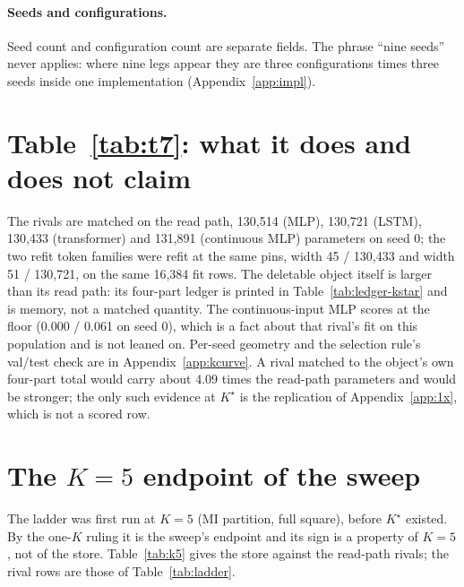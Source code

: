 \documentclass{article} %
\newcommand{\Kstar}{\ensuremath{K^{\star}}}
\begin{document}
\paragraph{Seeds and configurations.} Seed count and configuration count are separate fields. The
phrase ``nine seeds'' never applies: where nine legs appear they are three configurations times
three seeds inside one implementation (Appendix~\ref{app:impl}).

\section{Table~\ref{tab:t7}: what it does and does not claim}
\label{app:t7more}
The rivals are matched on the read path,
130,514 (MLP), 130,721 (LSTM), 130,433 (transformer) and 131,891 (continuous MLP) parameters
on seed 0; the two refit token families were refit at the same pins, width 45 / 130,433 and
width 51 / 130,721, on the same 16,384 fit rows. %
The deletable object itself is larger than its read path: its four-part ledger is printed in
Table~\ref{tab:ledger-kstar} and is memory, not a matched quantity. The continuous-input MLP
scores at the floor (0.000 / 0.061 on seed 0), which is a fact about that rival's fit on this
population and is not leaned on. %
Per-seed geometry and the selection rule's val/test check are in Appendix~\ref{app:kcurve}.
A rival matched to the object's own four-part total would carry about 4.09 times the
read-path parameters and would be stronger; the only such evidence at $\Kstar$ is the
replication of Appendix~\ref{app:1x}, which is not a scored row. %


\section{The $K=5$ endpoint of the sweep}
\label{app:k5}

The ladder was first run at $K=5$ (MI partition, full square), before $\Kstar$ existed. By the
one-$K$ ruling it is the sweep's endpoint and its sign is a property of $K=5$, not of the store.
Table~\ref{tab:k5} gives the store against the read-path rivals; the rival rows are those of
Table~\ref{tab:ladder}.
\end{document}
